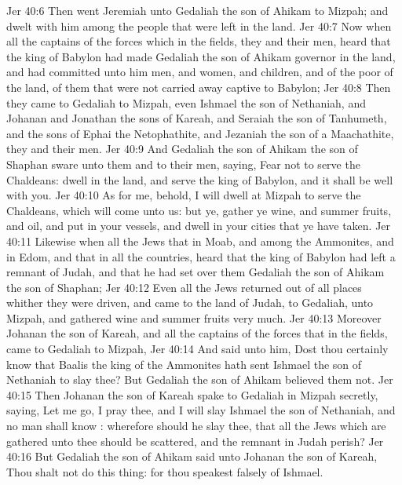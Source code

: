 \vs Jer 40:6 Then went Jeremiah unto Gedaliah the son of Ahikam to Mizpah; and dwelt with him among the people that were left in the land.
\vs Jer 40:7 Now when all the captains of the forces which  in the fields,  they and their men, heard that the king of Babylon had made Gedaliah the son of Ahikam governor in the land, and had committed unto him men, and women, and children, and of the poor of the land, of them that were not carried away captive to Babylon;
\vs Jer 40:8 Then they came to Gedaliah to Mizpah, even Ishmael the son of Nethaniah, and Johanan and Jonathan the sons of Kareah, and Seraiah the son of Tanhumeth, and the sons of Ephai the Netophathite, and Jezaniah the son of a Maachathite, they and their men.
\vs Jer 40:9 And Gedaliah the son of Ahikam the son of Shaphan sware unto them and to their men, saying, Fear not to serve the Chaldeans: dwell in the land, and serve the king of Babylon, and it shall be well with you.
\vs Jer 40:10 As for me, behold, I will dwell at Mizpah to serve the Chaldeans, which will come unto us: but ye, gather ye wine, and summer fruits, and oil, and put  in your vessels, and dwell in your cities that ye have taken.
\vs Jer 40:11 Likewise when all the Jews that  in Moab, and among the Ammonites, and in Edom, and that  in all the countries, heard that the king of Babylon had left a remnant of Judah, and that he had set over them Gedaliah the son of Ahikam the son of Shaphan;
\vs Jer 40:12 Even all the Jews returned out of all places whither they were driven, and came to the land of Judah, to Gedaliah, unto Mizpah, and gathered wine and summer fruits very much.
\vs Jer 40:13 Moreover Johanan the son of Kareah, and all the captains of the forces that  in the fields, came to Gedaliah to Mizpah,
\vs Jer 40:14 And said unto him, Dost thou certainly know that Baalis the king of the Ammonites hath sent Ishmael the son of Nethaniah to slay thee? But Gedaliah the son of Ahikam believed them not.
\vs Jer 40:15 Then Johanan the son of Kareah spake to Gedaliah in Mizpah secretly, saying, Let me go, I pray thee, and I will slay Ishmael the son of Nethaniah, and no man shall know : wherefore should he slay thee, that all the Jews which are gathered unto thee should be scattered, and the remnant in Judah perish?
\vs Jer 40:16 But Gedaliah the son of Ahikam said unto Johanan the son of Kareah, Thou shalt not do this thing: for thou speakest falsely of Ishmael.
